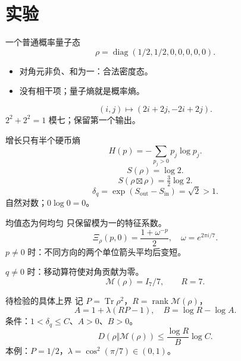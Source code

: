 \documentclass{beamer}
\begin{document}
\section{实验}
\begin{frame}{一个普通概率量子态}
\[\rho=\operatorname{diag}(1/2,1/2,0,0,0,0,0).\]
\begin{itemize}
\item 对角元非负、和为一：合法密度态。
\item 没有相干项；量子熵就是概率熵。
\end{itemize}
\[(i,j)\mapsto(2i+2j,-2i+2j).\]
$2^2+2^2=1$ 模七；保留第一个输出。
\end{frame}
\begin{frame}{增长只有半个硬币熵}
\[H(p)=-\sum_{p_j>0}p_j\log p_j.\]
\[S(\rho)=\log2.\]
\[S(\rho\boxtimes\rho)=\tfrac32\log2.\]
\[\delta_q=\exp(S_{\mathrm{out}}-S_{\mathrm{in}})=\sqrt2>1.\]
自然对数；$0\log0=0$。
\end{frame}
\begin{frame}{均值态为何均匀}
只保留模为一的特征系数。
\[\Xi_\rho(p,0)=\frac{1+\omega^{-p}}2,\quad\omega=e^{2\pi i/7}.\]
$p\ne0$ 时：不同方向的两个单位箭头平均后变短。

$q\ne0$ 时：移动算符使对角贡献为零。
\[\mathcal M(\rho)=I_7/7,\qquad R=7.\]
\end{frame}
\begin{frame}{待检验的具体上界}
记 $P=\operatorname{Tr}\rho^2$，$R=\operatorname{rank}\mathcal M(\rho)$，
\[A=1+\lambda(RP-1),\quad B=\log R-\log A.\]
条件：$1\mathrel{<}\delta_q\le C$、$A>0$、$B>0$。
\[D(\rho\Vert\mathcal M(\rho))\le\frac{\log R}{B}\log C.\tag{58}\]
本例：$P=1/2$，$\lambda=\cos^2(\pi/7)\in(0,1)$。
\end{frame}
\end{document}
